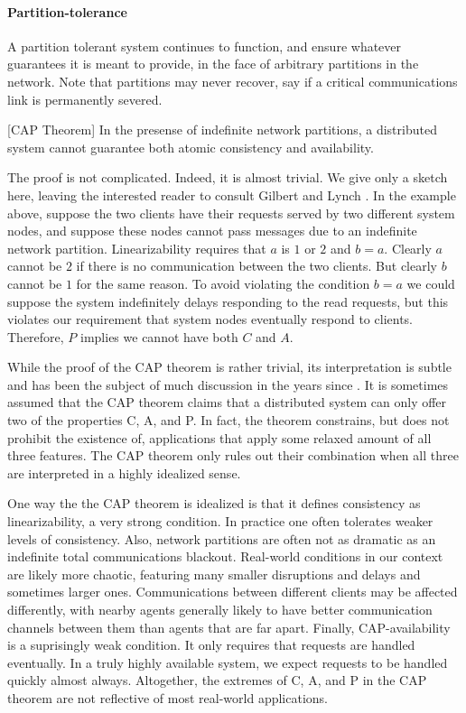 \paragraph{Partition-tolerance}

A partition tolerant system continues to function, and ensure whatever
guarantees it is meant to provide, in the face of arbitrary partitions
in the network. Note that partitions may never recover, say if a
critical communications link is permanently severed.

\begin{theorem}\label{thm:cap}[CAP Theorem]
In the presense of indefinite network partitions, a distributed system
cannot guarantee both atomic consistency and availability.
\end{theorem}

The proof is not complicated. Indeed, it is almost trivial. We give
only a sketch here, leaving the interested reader to consult Gilbert
and Lynch \cite{2002gilbertlynchCAP}. In the example above, suppose the two clients have
their requests served by two different system nodes, and suppose these
nodes cannot pass messages due to an indefinite network
partition. Linearizability requires that $a$ is $1$ or $2$ and $b =
a$.  Clearly $a$ cannot be $2$ if there is no communication between
the two clients. But clearly $b$ cannot be $1$ for the same reason.
To avoid violating the condition $b = a$ we could suppose the system
indefinitely delays responding to the read requests, but this violates
our requirement that system nodes eventually respond to
clients. Therefore, $P$ implies we cannot have both $C$ and $A$.

While the proof of the CAP theorem is rather trivial, its
interpretation is subtle and has been the subject of much discussion
in the years since \cite{2012CAP12Years}. It is sometimes assumed that
the CAP theorem claims that a distributed system can only offer two of
the properties C, A, and P. In fact, the theorem constrains, but does
not prohibit the existence of, applications that apply some relaxed
amount of all three features. The CAP theorem only rules out their
combination when all three are interpreted in a highly idealized
sense.

One way the the CAP theorem is idealized is that it defines
consistency as linearizability, a very strong condition. In practice
one often tolerates weaker levels of consistency. Also, network
partitions are often not as dramatic as an indefinite total
communications blackout. Real-world conditions in our context are
likely more chaotic, featuring many smaller disruptions and delays and
sometimes larger ones. Communications between different clients may be
affected differently, with nearby agents generally likely to have
better communication channels between them than agents that are far
apart. Finally, CAP-availability is a suprisingly weak condition. It
only requires that requests are handled eventually. In a truly highly
available system, we expect requests to be handled quickly almost
always. Altogether, the extremes of C, A, and P in the CAP theorem are
not reflective of most real-world applications.


